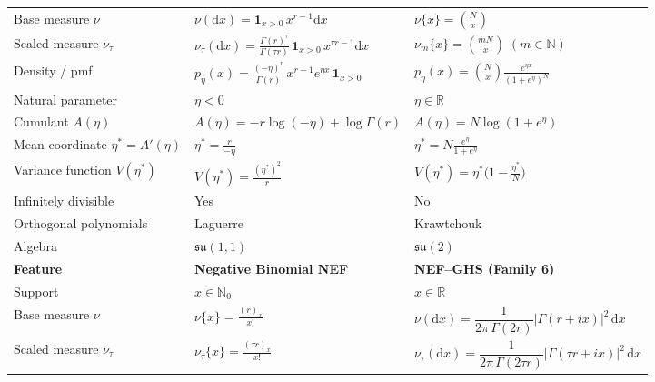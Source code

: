 \documentclass[a4paper,11pt]{article}
\numberwithin{equation}{section}
\theoremstyle{plain}
\theoremstyle{definition}
\theoremstyle{remark}
\newcommand{\R}{\ensuremath{\mathbb{R}}\xspace}
\newcommand{\1}{\ensuremath{\mathds{1}}\xspace}
\newcommand{\dd}{\ensuremath{{\textrm{d}}}\xspace}
\begin{document}
\begin{table}[p]
\begin{tabularx}{\linewidth}{lXX}
Base measure $\nu$
& $\nu(\dd x)=\mathbf{1}_{x>0}\,x^{r-1}\dd x$
& $\nu\{x\}=\binom{N}{x}$
\\[3pt]

Scaled measure $\nu_\tau$
& $\nu_\tau(\dd x)=\frac{\Gamma(r)^\tau}{\Gamma(\tau r)}\,\mathbf{1}_{x>0}\,x^{\tau r-1}\dd x$
& $\nu_m\{x\}=\binom{mN}{x}\;(m\in\mathbb{N})$
\\[3pt]

Density / pmf
& $p_\eta(x)=\frac{(-\eta)^r}{\Gamma(r)}\,x^{r-1}e^{\eta x}\,\mathbf{1}_{x>0}$
& $p_\eta(x)=\binom{N}{x}\frac{e^{\eta x}}{(1+e^\eta)^N}$
\\[3pt]

Natural parameter
& $\eta<0$
& $\eta\in\R$
\\[3pt]

Cumulant $A(\eta)$
& $A(\eta)=-r\log(-\eta)+\log\Gamma(r)$
& $A(\eta)=N\log(1+e^\eta)$
\\[3pt]

Mean coordinate $\eta^\ast=A'(\eta)$
& $\eta^\ast=\frac{r}{-\eta}$
& $\eta^\ast=N\frac{e^\eta}{1+e^\eta}$
\\[3pt]

Variance function $V(\eta^\ast)$
& $V(\eta^\ast)=\frac{(\eta^\ast)^2}{r}$
& $V(\eta^\ast)=\eta^\ast\Big(1-\frac{\eta^\ast}{N}\Big)$
\\[3pt]

Infinitely divisible
& Yes
& No
\\[3pt]

Orthogonal polynomials
& Laguerre
& Krawtchouk
\\[3pt]

Algebra
& $\mathfrak{su}(1,1)$
& $\mathfrak{su}(2)$
\\

\midrule

\textbf{Feature} 
& \textbf{Negative Binomial NEF} 
& \textbf{NEF--GHS (Family 6)}
\\
\midrule

Support
& $x\in\mathbb{N}_0$
& $x\in\R$
\\[3pt]

Base measure $\nu$
& $\nu\{x\}=\frac{(r)_x}{x!}$
& $\nu(\dd x)=\dfrac{1}{2\pi\,\Gamma(2r)}\left|\Gamma(r+i x)\right|^2\,\dd x$
\\[3pt]

Scaled measure $\nu_\tau$
& $\nu_\tau\{x\}=\frac{(\tau r)_x}{x!}$
& $\nu_\tau(\dd x)=\dfrac{1}{2\pi\,\Gamma(2\tau r)}\left|\Gamma(\tau r+i x)\right|^2\,\dd x$
\\[3pt]


\end{tabularx}
\end{table}
\end{document}
